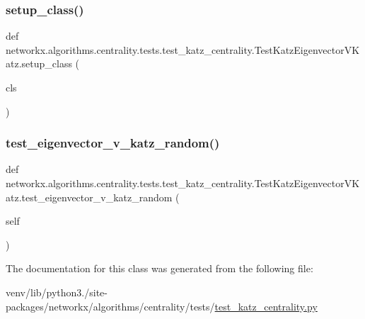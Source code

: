 \subsubsection{\texorpdfstring{setup\+\_\+class()}{setup\_class()}}
{\footnotesize\ttfamily def networkx.\+algorithms.\+centrality.\+tests.\+test\+\_\+katz\+\_\+centrality.\+Test\+Katz\+Eigenvector\+V\+Katz.\+setup\+\_\+class (\begin{DoxyParamCaption}\item[{}]{cls }\end{DoxyParamCaption})}

\mbox{\label{classnetworkx_1_1algorithms_1_1centrality_1_1tests_1_1test__katz__centrality_1_1TestKatzEigenvectorVKatz_aa09133adeb19ed3d6bde500ed4dacb28}} 
\subsubsection{\texorpdfstring{test\+\_\+eigenvector\+\_\+v\+\_\+katz\+\_\+random()}{test\_eigenvector\_v\_katz\_random()}}
{\footnotesize\ttfamily def networkx.\+algorithms.\+centrality.\+tests.\+test\+\_\+katz\+\_\+centrality.\+Test\+Katz\+Eigenvector\+V\+Katz.\+test\+\_\+eigenvector\+\_\+v\+\_\+katz\+\_\+random (\begin{DoxyParamCaption}\item[{}]{self }\end{DoxyParamCaption})}



The documentation for this class was generated from the following file\+:\begin{DoxyCompactItemize}
\item 
venv/lib/python3./site-\/packages/networkx/algorithms/centrality/tests/\hyperlink{test__katz__centrality_8py}{test\+\_\+katz\+\_\+centrality.\+py}\end{DoxyCompactItemize}

